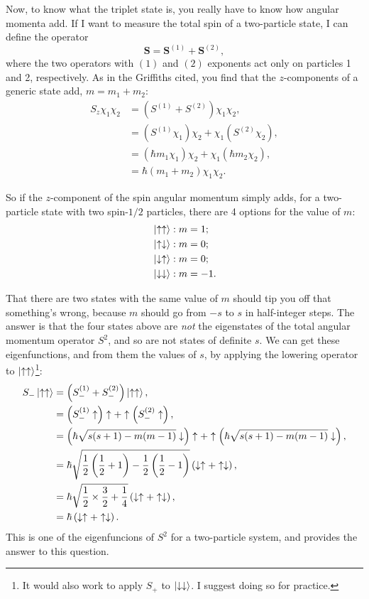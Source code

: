 \documentclass[11pt]{paper}
\begin{document}
Now, to know what the triplet state is, you really have to know how angular momenta add.  If I want to measure the total spin of a two-particle state, I can define the operator
\begin{equation}
\mathbf{S} = \mathbf{S}^{(1)}+\mathbf{S}^{(2)}, 
\end{equation}
where the two operators with $(1)$ and $(2)$ exponents act only on particles 1 and 2, respectively.  As in the Griffiths cited, you find that the $z$-components of a generic state add, $m=m_1+m_2$:
\begin{align}
S_z\chi_1\chi_2 &= (S^{(1)}+S^{(2)})\chi_1\chi_2,\\
&=\left(S^{(1)}\chi_1\right)\chi_2 + \chi_1\left(S^{(2)}\chi_2\right),\\
&=\left(\hbar m_1\chi_1\right)\chi_2 + \chi_1\left(\hbar m_2 \chi_2\right),\\
&=\hbar(m_1+m_2)\chi_1\chi_2.
\end{align}

So if the $z$-component of the spin angular momentum simply adds, for a two-particle state with two spin-$1/2$ particles, there are 4 options for the value of $m$:
\begin{align}
&\ket{\uparrow\uparrow}:m=1;\\
&\ket{\uparrow\downarrow}:m=0;\\
&\ket{\downarrow\uparrow}:m=0;\\
&\ket{\downarrow\downarrow}:m=-1.
\end{align}

That there are two states with the same value of $m$ should tip you off that something's wrong, because $m$ should go from $-s$ to $s$ in half-integer steps. The answer is that the four states above are \emph{not} the eigenstates of the total angular momentum operator $S^2$, and so are not states of definite $s$.  We can get these eigenfunctions, and from them the values of $s$, by applying the lowering operator to $\ket{\uparrow\uparrow}$\footnote{It would also work to apply $S_+$ to $\ket{\downarrow\downarrow}$.  I suggest doing so for practice.}:
\begin{align}
S_-\ket{\uparrow\uparrow} &= \left(S^{(1)}_-+S^{(2)}_-\right)\ket{\uparrow\uparrow},\\
&=\left(S^{(1)}_-\uparrow\right)\uparrow + \uparrow\left(S^{(2)}_-\uparrow\right),\\
&=\left(\hbar\sqrt{s(s+1)-m(m-1)}\downarrow\right)\uparrow + \uparrow\left(\hbar\sqrt{s(s+1)-m(m-1)}\downarrow\right),\\
&=\hbar\sqrt{\frac{1}{2}\left(\frac{1}{2}+1\right)-\frac{1}{2}\left(\frac{1}{2}-1\right)}\left(\downarrow\uparrow + \uparrow\downarrow\right),\\
&=\hbar\sqrt{\frac{1}{2}\times\frac{3}{2}+\frac{1}{4}}\left(\downarrow\uparrow + \uparrow\downarrow\right),\\
&=\hbar\left(\downarrow\uparrow + \uparrow\downarrow\right).
\end{align}
This is one of the eigenfuncions of $S^2$ for a two-particle system, and provides the answer to this question.
\end{document}
